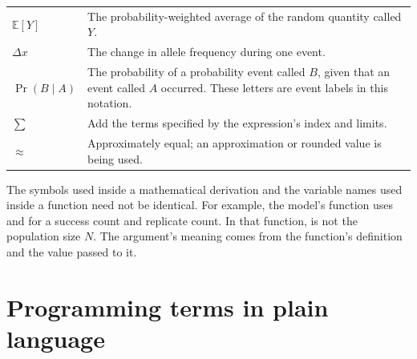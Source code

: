 \begin{longtable}{p{}p{}}
\(\mathbb{E}[Y]\) & The probability-weighted average of the random quantity
                      called \(Y\). \\
\(\Delta x\) & The change in allele frequency during one event. \\
\(\Pr(B\mid A)\) & The probability of a probability event called \(B\),
                    given that an event called \(A\) occurred. These letters
                    are event labels in this notation. \\
\(\sum\) & Add the terms specified by the expression's index and limits. \\
\(\approx\) & Approximately equal; an approximation or rounded value is
               being used. \\
\bottomrule
\end{longtable}

The symbols used inside a mathematical derivation and the variable names
used inside a function need not be identical. For example, the model's
function  uses  and  for a
success count and replicate count. In that function,  is not the
population size \(N\). The argument's meaning comes from the function's
definition and the value passed to it.

\section{Programming terms in plain language}

